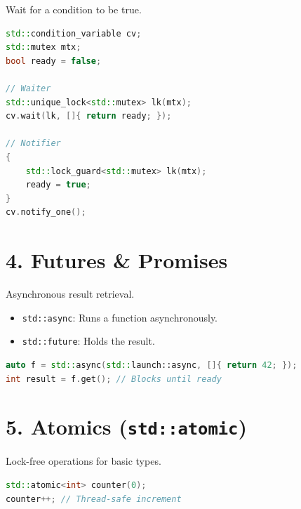 Wait for a condition to be true.

\begin{lstlisting}[language={C++}]
std::condition_variable cv;
std::mutex mtx;
bool ready = false;

// Waiter
std::unique_lock<std::mutex> lk(mtx);
cv.wait(lk, []{ return ready; });

// Notifier
{
    std::lock_guard<std::mutex> lk(mtx);
    ready = true;
}
cv.notify_one();
\end{lstlisting}

\hypertarget{futures-promises}{%
\section{4. Futures \& Promises}\label{futures-promises}}

Asynchronous result retrieval.

\begin{itemize}
\tightlist
\item
  \passthrough{\lstinline!std::async!}: Runs a function asynchronously.
\item
  \passthrough{\lstinline!std::future!}: Holds the result.
\end{itemize}

\begin{lstlisting}[language={C++}]
auto f = std::async(std::launch::async, []{ return 42; });
int result = f.get(); // Blocks until ready
\end{lstlisting}

\hypertarget{atomics-stdatomic}{%
\section{\texorpdfstring{5. Atomics
(\texttt{std::atomic})}{5. Atomics (std::atomic)}}\label{atomics-stdatomic}}

Lock-free operations for basic types.

\begin{lstlisting}[language={C++}]
std::atomic<int> counter(0);
counter++; // Thread-safe increment
\end{lstlisting}
